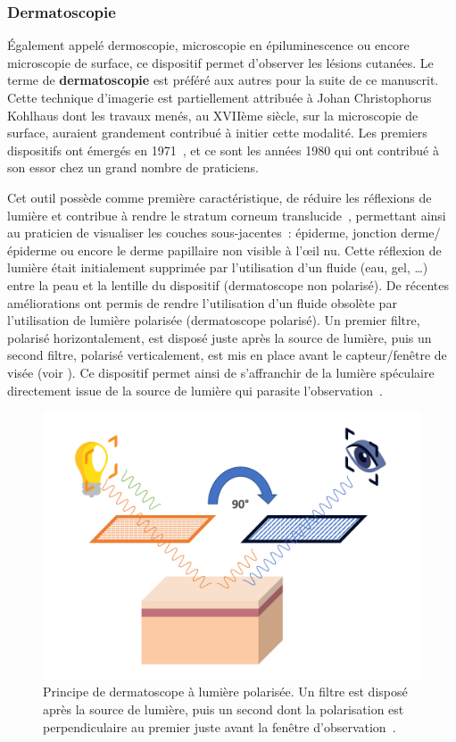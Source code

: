 \subsubsection{Dermatoscopie}
Également appelé dermoscopie, microscopie en épiluminescence ou encore microscopie de surface, ce dispositif permet d’observer les lésions cutanées. Le terme de \textbf{dermatoscopie} est préféré aux autres pour la suite de ce manuscrit. Cette technique d’imagerie est partiellement attribuée à Johan Christophorus Kohlhaus dont les travaux menés, au XVIIème siècle, sur la microscopie de surface, auraient grandement contribué à initier cette modalité. Les premiers dispositifs ont émergés en 1971~\cite{MacKie1972}, et ce sont les années 1980 qui ont contribué à son essor chez un grand nombre de praticiens.\par

Cet outil possède comme première caractéristique, de réduire les réflexions de lumière et contribue à rendre le stratum corneum translucide~\cite{Katz2001}, permettant ainsi au praticien de visualiser les couches sous-jacentes~: épiderme, jonction derme/épiderme ou encore le derme papillaire non visible à l’œil nu. Cette réflexion de lumière était initialement supprimée par l’utilisation d’un fluide (eau, gel, …) entre la peau et la lentille du dispositif (dermatoscope non polarisé). De récentes améliorations ont permis de rendre l'utilisation d'un fluide obsolète par l'utilisation de lumière polarisée (dermatoscope polarisé). Un premier filtre, polarisé horizontalement, est disposé juste après la source de lumière, puis un second filtre, polarisé verticalement, est mis en place avant le capteur/fenêtre de visée (voir ). Ce dispositif permet ainsi de s'affranchir de la lumière spéculaire directement issue de la source de lumière qui parasite l'observation~\cite{Campos-do-Carmo2008}.\par

\begin{figure}[H]
\centering
    \includegraphics[width=0.9\linewidth]{contents/chapter_2/resources/scheme_polarized_dermoscopy.pdf}
    \caption{Principe de dermatoscope à lumière polarisée. Un filtre est disposé après la source de lumière, puis un second dont la polarisation est perpendiculaire au premier juste avant la fenêtre d'observation~\cite{sonthalia2019}.}
    \label{fig:scheme_polarized_dermoscopy}
\end{figure}\par

